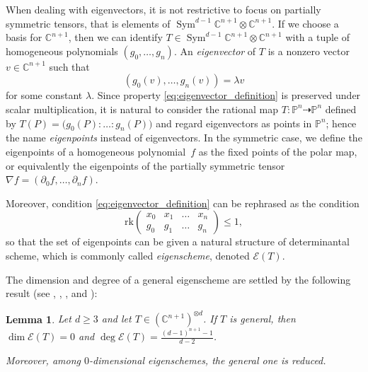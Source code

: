 \documentclass{amsart}
\theoremstyle{plain}
\newtheorem{lemma}{Lemma}[section]
\theoremstyle{definition}
\newcommand{\C}{\mathbb{C}}
\newcommand{\p}{\mathbb{P}}
\newcommand{\de}{\partial}
\newcommand{\Eig}[1]{\mathcal{E}\!\left( {#1} \right)}
\newcommand{\Sym}{\operatorname{Sym}}
\newcommand{\rk}{\ensuremath{\mathrm{rk}}}
\begin{document}
When dealing with eigenvectors, it is not restrictive to focus on partially symmetric tensors, that is elements of $\Sym^{d-1}\C^{n+1}\otimes\C^{n+1}$.
 If we choose a basis for $\C^{n+1}$, then we can identify $T\in \Sym^{d-1}\C^{n+1}\otimes\C^{n+1}$ with a tuple of homogeneous polynomials $(g_0,\dots,g_n)$. An \emph{eigenvector} of $T$ is a nonzero vector $v\in\C^{n+1}$ such that
%
\begin{equation}\label{eq:eigenvector_definition}
(g_0(v), \ldots, g_n(v))=\lambda v
\end{equation}
for some constant $\lambda$.
%
Since %
property \eqref{eq:eigenvector_definition} is preserved under scalar multiplication, it is natural to consider the rational map $T \colon \p^n\dashrightarrow\p^n$ defined by $T(P)=\bigl(g_0(P):\ldots:g_n(P)\bigr)$ and regard eigenvectors as points in $\p^n$; hence the name \emph{eigenpoints} instead of eigenvectors. In the symmetric case, we define the eigenpoints of a homogeneous polynomial~$f$ as the fixed points of the polar map, or equivalently the eigenpoints of the partially symmetric tensor $\nabla f = (\de_0f,\dots,\de_n f)$.

Moreover, condition \eqref{eq:eigenvector_definition} can be rephrased as the condition
\begin{equation}
\label{eq:def_matrix_general}
    \rk \begin{pmatrix}
    x_0 & x_1 & \dots & x_n \\
    g_0 & g_1 & \dots & g_n
    \end{pmatrix} \le 1,
\end{equation}
so that the set of eigenpoints can be given a natural structure of determinantal scheme, which is commonly called \emph{eigenscheme}, denoted $\Eig{T}$.

The dimension and degree of a general eigenscheme are settled by the following result (see \cite[Theorem 2.1]{CartSturm}, \cite{ASS}, \cite{OO}, and \cite[Equation~5.2]{Abo}):

\begin{lemma}\label{lem:nonempty}
Let $d\ge 3$ and let $T \in (\C^{n+1})^{\otimes d}$.
If $T$ is general, then $\dim \Eig{T}=0$ and $\deg \Eig{T}=\frac{(d-1)^{n+1}-1}{d-2}$.

  Moreover, among $0$-dimensional eigenschemes, the general one is reduced.
\end{lemma}
\end{document}

